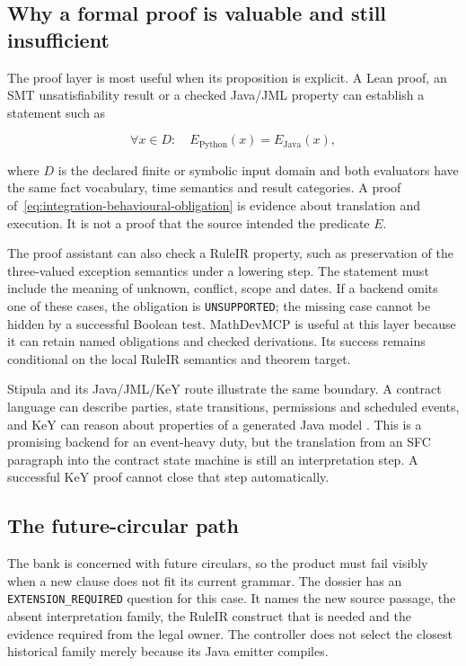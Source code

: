 \documentclass[12pt,a4paper,oneside,openany]{book}
\begin{document}
\subsection{Why a formal proof is valuable and still insufficient}

The proof layer is most useful when its proposition is explicit. A Lean proof,
an SMT unsatisfiability result or a checked Java/JML property can establish a
statement such as

\begin{equation}
  \forall x\in D:\quad E_{\mathrm{Python}}(x)=E_{\mathrm{Java}}(x),
  \label{eq:integration-behavioural-obligation}
\end{equation}

where $D$ is the declared finite or symbolic input domain and both evaluators
have the same fact vocabulary, time semantics and result categories. A proof
of~\eqref{eq:integration-behavioural-obligation} is evidence about translation
and execution. It is not a proof that the source intended the predicate
$E$.

The proof assistant can also check a RuleIR property, such as preservation of
the three-valued exception semantics under a lowering step. The statement must
include the meaning of unknown, conflict, scope and dates. If a backend omits
one of these cases, the obligation is \texttt{UNSUPPORTED}; the missing case
cannot be hidden by a successful Boolean test. MathDevMCP is useful at this
layer because it can retain named obligations and checked derivations. Its
success remains conditional on the local RuleIR semantics and theorem target.

Stipula and its Java/JML/KeY route illustrate the same boundary. A contract
language can describe parties, state transitions, permissions and scheduled
events, and KeY can reason about properties of a generated Java model
\citep[secs.~3--6]{stipula2021}\citep[secs.~3--5]{stipulakey2025}. This is a
promising backend for an event-heavy duty, but the translation from an SFC
paragraph into the contract state machine is still an interpretation step. A
successful KeY proof cannot close that step automatically.

\subsection{The future-circular path}

The bank is concerned with future circulars, so the product must fail visibly
when a new clause does not fit its current grammar. The dossier has an
\texttt{EXTENSION\_REQUIRED} question for this case. It names the new source
passage, the absent interpretation family, the RuleIR construct that is needed
and the evidence required from the legal owner. The controller does not select
the closest historical family merely because its Java emitter compiles.
\end{document}
